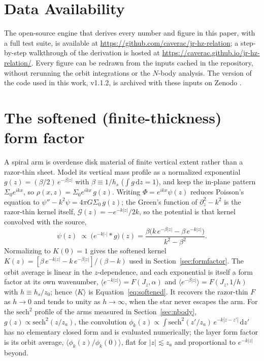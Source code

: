 \documentclass[twocolumn]{aastex701}
\newcommand{\Jz}{J_z}
\begin{document}
\section*{Data Availability}
The open-source engine that derives every number and figure in this paper, with a full
test suite, is available at \url{https://github.com/caverac/jr-hz-relation}; a
step-by-step walkthrough of the derivation is hosted at
\url{https://caverac.github.io/jr-hz-relation/}. Every figure can be redrawn from the
inputs cached in the repository, without rerunning the orbit integrations or the
$N$-body analysis. The version of the code used in this work, v1.1.2, is archived with
these inputs on Zenodo \citep{VeraCiro2026software}.

\appendix

\section{The softened (finite-thickness) form factor}
\label{app:softened}

A spiral arm is overdense disk material of finite vertical extent rather than a
razor-thin sheet. Model its vertical mass profile as a normalized exponential
$g(z)=(\beta/2)\,e^{-\beta|z|}$ with $\beta\equiv1/h_s$ ($\int\!g\,\mathrm{d}z=1$), and
keep the in-plane pattern $\Sigma_0 e^{ikx}$, so $\rho(x,z)=\Sigma_0 e^{ikx}\,g(z)$.
Writing $\Phi=e^{ikx}\psi(z)$ reduces Poisson's equation to
$\psi''-k^2\psi=4\pi G\Sigma_0\,g(z)$; the Green's function of $\partial_z^2-k^2$ is the
razor-thin kernel itself, $\mathcal{G}(z)=-e^{-k|z|}/2k$, so the potential is that
kernel convolved with the source,
%
\begin{equation}
  \psi(z)\;\propto\;\big(e^{-k|\cdot|}\!*g\big)(z)
  =\frac{\beta\big(k\,e^{-\beta|z|}-\beta\,e^{-k|z|}\big)}{k^2-\beta^2}.
  \label{eq:convolution}
\end{equation}
%
Normalizing to $K(0)=1$ gives the softened kernel
$K(z)=[\beta\,e^{-k|z|}-k\,e^{-\beta|z|}]/(\beta-k)$ used in
Section~\ref{sec:formfactor}. The orbit average is linear in the $z$-dependence, and
each exponential is itself a form factor at its own wavenumber,
$\langle e^{-k|z|}\rangle=F(\Jz,\alpha)$ and $\langle e^{-\beta|z|}\rangle=F(\Jz,1/h)$
with $h\equiv h_s/z_0$; hence $\langle K\rangle$ is Equation~\eqref{eq:softened}. It
recovers the razor-thin $F$ as $h\to0$ and tends to unity as $h\to\infty$, when the
star never escapes the arm. For the $\mathrm{sech}^2$ profile of the arms measured in
Section~\ref{sec:nbody}, $g(z)\propto\mathrm{sech}^2(z/z_a)$, the convolution
$\phi_k(z)\propto\int\mathrm{sech}^2(z'/z_a)\,e^{-k|z-z'|}\,\mathrm{d}z'$ has no
elementary closed form and is evaluated numerically; the layer form factor is its
orbit average, $\langle\phi_k(z)/\phi_k(0)\rangle$, flat for $|z|\lesssim z_a$ and
proportional to $e^{-k|z|}$ beyond.
\end{document}
